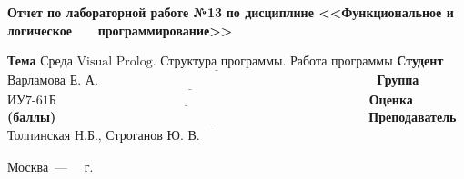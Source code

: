\documentclass[12pt]{report}
\begin{document}
\begin{titlepage}
		\begin{center}
			\noindent\begin{minipage}{1.1\textwidth}\centering
				\Large\textbf{Отчет по лабораторной работе №13}\newline
				\textbf{по дисциплине <<Функциональное и логическое}\newline
				\textbf{~~~программирование>>}\newline\newline
			\end{minipage}
		\end{center}
		
		\noindent\textbf{Тема} $\underline{\text{Среда Visual Prolog. Структура программы. Работа программы}}$\newline\newline
		\noindent\textbf{Студент} $\underline{\text{Варламова Е. А.~~~~~~~~~~~~~~~~~~~~~~~~~~~~~~~~~~~~~~~~~~~~~~~~~~~~~~~~~~~~~~~~~}}$\newline\newline
		\noindent\textbf{Группа} $\underline{\text{ИУ7-61Б~~~~~~~~~~~~~~~~~~~~~~~~~~~~~~~~~~~~~~~~~~~~~~~~~~~~~~~~~~~~~~~~~~~~~~~~~}}$\newline\newline
		\noindent\textbf{Оценка (баллы)} $\underline{\text{~~~~~~~~~~~~~~~~~~~~~~~~~~~~~~~~~~~~~~~~~~~~~~~~~~~~~~~~~~~~~~~~~~~~~~~~}}$\newline\newline
		\noindent\textbf{Преподаватель} $\underline{\text{Толпинская Н.Б., Строганов Ю. В.~~~~~~~~~~~~~~~~~~~~~~~~~~}}$\newline\newline\newline
		
		\begin{center}
			\vfill
			Москва~---~\the\year
			~г.
		\end{center}
	\end{titlepage}
\end{document}
